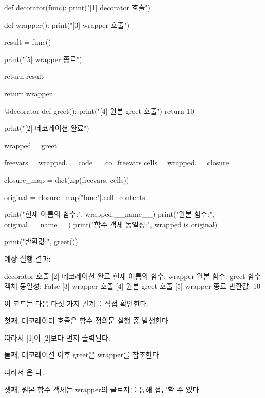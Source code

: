 \begin{dhkcode}
def decorator(func):
    print("[1] decorator 호출")

    def wrapper():
        print("[3] wrapper 호출")

        result = func()

        print("[5] wrapper 종료")

        return result

    return wrapper


@decorator
def greet():
    print("[4] 원본 greet 호출")
    return 10


print("[2] 데코레이션 완료")

wrapped = greet

freevars = wrapped.__code__.co_freevars
cells = wrapped.__closure__

closure_map = dict(zip(freevars, cells))

original = closure_map["func"].cell_contents

print("현재 이름의 함수:", wrapped.__name__)
print("원본 함수:", original.__name__)
print("함수 객체 동일성:", wrapped is original)

print("반환값:", greet())
\end{dhkcode}

예상 실행 결과:

\begin{dhkzsh}
[1] decorator 호출
[2] 데코레이션 완료
현재 이름의 함수: wrapper
원본 함수: greet
함수 객체 동일성: False
[3] wrapper 호출
[4] 원본 greet 호출
[5] wrapper 종료
반환값: 10
\end{dhkzsh}

이 코드는 다음 다섯 가지 관계를 직접 확인한다.

\begin{dhknote}
\begin{dhksmry}[centered]
첫째, 데코레이터 호출은 함수 정의문 실행 중 발생한다
\end{dhksmry}
\end{dhknote}

따라서 [1]이 [2]보다 먼저 출력된다.

\begin{dhknote}
\begin{dhksmry}[centered]
둘째, 데코레이션 이후 greet은 wrapper를 참조한다
\end{dhksmry}
\end{dhknote}

따라서 은 다.

\begin{dhknote}
\begin{dhksmry}[centered]
셋째, 원본 함수 객체는 wrapper의 클로저를 통해 접근할 수 있다
\end{dhksmry}
\end{dhknote}

